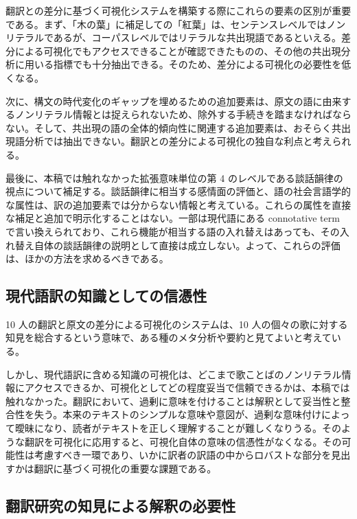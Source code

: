 \documentclass[
  letterpaper,
  DIV=11,
  numbers=noendperiod]{scrartcl}
\begin{document}
翻訳との差分に基づく可視化システムを構築する際にこれらの要素の区別が重要である。まず、「木の葉」に補足しての「紅葉」は、センテンスレベルではノンリテラルであるが、コーパスレベルではリテラルな共出現語であるといえる。差分による可視化でもアクセスできることが確認できたものの、その他の共出現分析に用いる指標でも十分抽出できる。そのため、差分による可視化の必要性を低くなる。

次に、構文の時代変化のギャップを埋めるための追加要素は、原文の語に由来するノンリテラル情報とは捉えられないため、除外する手続きを踏まなければならない。そして、共出現の語の全体的傾向性に関連する追加要素は、おそらく共出現語分析では抽出できない。翻訳との差分による可視化の独自な利点と考えられる。

最後に、本稿では触れなかった拡張意味単位の第 4
のレベルである談話韻律の視点について補足する。談話韻律に相当する感情面の評価と、語の社会言語学的な属性は、訳の追加要素では分からない情報と考えている。これらの属性を直接な補足と追加で明示化することはない。一部は現代語にある
connotative term
で言い換えられており、これら機能が相当する語の入れ替えはあっても、その入れ替え自体の談話韻律の説明として直接は成立しない。よって、これらの評価は、ほかの方法を求めるべきである。

\subsection{現代語訳の知識としての信憑性}\label{ux73feux4ee3ux8a9eux8a33ux306eux77e5ux8b58ux3068ux3057ux3066ux306eux4fe1ux6191ux6027}

10 人の翻訳と原文の差分による可視化のシステムは、10
人の個々の歌に対する知見を総合するという意味で、ある種のメタ分析や要約と見てよいと考えている。

しかし、現代語訳に含める知識の可視化は、どこまで歌ことばのノンリテラル情報にアクセスできるか、可視化としてどの程度妥当で信頼できるかは、本稿では触れなかった。翻訳において、過剰に意味を付けることは解釈として妥当性と整合性を失う。本来のテキストのシンプルな意味や意図が、過剰な意味付けによって曖昧になり、読者がテキストを正しく理解することが難しくなりうる。そのような翻訳を可視化に応用すると、可視化自体の意味の信憑性がなくなる。その可能性は考慮すべき一環であり、いかに訳者の訳語の中からロバストな部分を見出すかは翻訳に基づく可視化の重要な課題である。

\subsection{翻訳研究の知見による解釈の必要性}\label{ux7ffbux8a33ux7814ux7a76ux306eux77e5ux898bux306bux3088ux308bux89e3ux91c8ux306eux5fc5ux8981ux6027}
\end{document}
